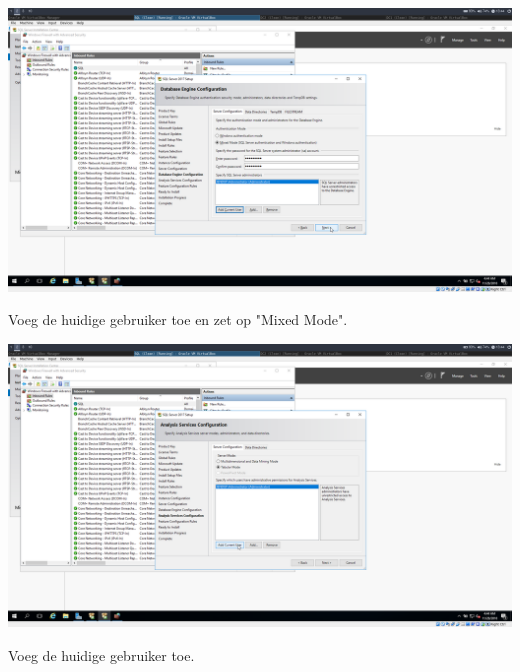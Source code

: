 \documentclass[a4paper]{article}
\begin{document}
\begin{center}
	\includegraphics[width=15cm]{Pictures/SQL/1543409041.png}
	
	Voeg de huidige gebruiker toe en zet op "Mixed Mode".
\end{center}
\begin{center}
	\includegraphics[width=15cm]{Pictures/SQL/1543409049.png}
	
	Voeg de huidige gebruiker toe.
\end{center}
\end{document}
